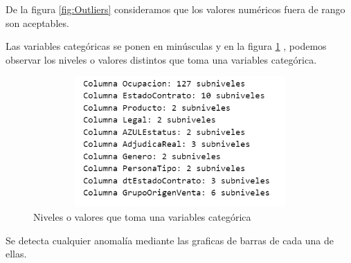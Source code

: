 De la figura \ref{fig:Outliers} consideramos que los valores numéricos fuera de rango son aceptables.

Las variables categóricas se ponen en minúsculas y en la figura \ref{fig:NivelesCate} , podemos observar 
los niveles o valores distintos que toma una variables categórica. \medskip
\begin{figure}[H]
    \centering
       \includegraphics[width=12cm, height=5cm ]{Imagenes/SubNivelesCategoricas.PNG}
      \caption{Niveles o valores que toma una variables categórica}
      \label{fig:NivelesCate}
\end{figure}

Se detecta cualquier anomalía mediante las graficas de barras de cada una de ellas.\medskip


